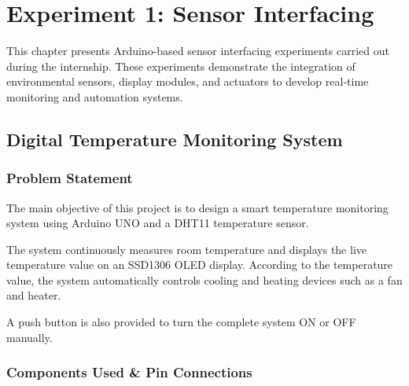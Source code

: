 
\chapter{Experiment 1: Sensor Interfacing}

This chapter presents Arduino-based sensor interfacing experiments carried out during the internship. These experiments demonstrate the integration of environmental sensors, display modules, and actuators to develop real-time monitoring and automation systems.


\section{Digital Temperature Monitoring System}


\subsection{Problem Statement}

The main objective of this project is to design a smart temperature monitoring system using Arduino UNO and a DHT11 temperature sensor.

The system continuously measures room temperature and displays the live temperature value on an SSD1306 OLED display. According to the temperature value, the system automatically controls cooling and heating devices such as a fan and heater.

A push button is also provided to turn the complete system ON or OFF manually.


\subsection{Components Used \& Pin Connections}

